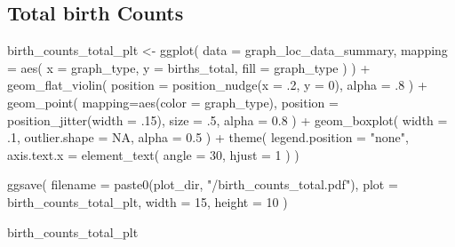 \documentclass[
]{book}
\newenvironment{Shaded}{\begin{snugshade}}{\end{snugshade}}
\newcommand{\AttributeTok}[1]{\textcolor[rgb]{0.77,0.63,0.00}{#1}}
\newcommand{\ConstantTok}[1]{\textcolor[rgb]{0.00,0.00,0.00}{#1}}
\newcommand{\DecValTok}[1]{\textcolor[rgb]{0.00,0.00,0.81}{#1}}
\newcommand{\FloatTok}[1]{\textcolor[rgb]{0.00,0.00,0.81}{#1}}
\newcommand{\FunctionTok}[1]{\textcolor[rgb]{0.00,0.00,0.00}{#1}}
\newcommand{\NormalTok}[1]{#1}
\newcommand{\OtherTok}[1]{\textcolor[rgb]{0.56,0.35,0.01}{#1}}
\newcommand{\SpecialCharTok}[1]{\textcolor[rgb]{0.00,0.00,0.00}{#1}}
\newcommand{\StringTok}[1]{\textcolor[rgb]{0.31,0.60,0.02}{#1}}
\begin{document}
\hypertarget{total-birth-counts}{%
\subsection{Total birth Counts}\label{total-birth-counts}}

\begin{Shaded}
\begin{Highlighting}[]
\NormalTok{birth\_counts\_total\_plt }\OtherTok{\textless{}{-}} \FunctionTok{ggplot}\NormalTok{(}
    \AttributeTok{data =}\NormalTok{ graph\_loc\_data\_summary,}
    \AttributeTok{mapping =} \FunctionTok{aes}\NormalTok{(}
      \AttributeTok{x =}\NormalTok{ graph\_type,}
      \AttributeTok{y =}\NormalTok{ births\_total,}
      \AttributeTok{fill =}\NormalTok{ graph\_type}
\NormalTok{    )}
\NormalTok{  ) }\SpecialCharTok{+}
  \FunctionTok{geom\_flat\_violin}\NormalTok{(}
    \AttributeTok{position =} \FunctionTok{position\_nudge}\NormalTok{(}\AttributeTok{x =}\NormalTok{ .}\DecValTok{2}\NormalTok{, }\AttributeTok{y =} \DecValTok{0}\NormalTok{),}
    \AttributeTok{alpha =}\NormalTok{ .}\DecValTok{8}
\NormalTok{  ) }\SpecialCharTok{+}
  \FunctionTok{geom\_point}\NormalTok{(}
    \AttributeTok{mapping=}\FunctionTok{aes}\NormalTok{(}\AttributeTok{color =}\NormalTok{ graph\_type),}
    \AttributeTok{position =} \FunctionTok{position\_jitter}\NormalTok{(}\AttributeTok{width =}\NormalTok{ .}\DecValTok{15}\NormalTok{),}
    \AttributeTok{size =}\NormalTok{ .}\DecValTok{5}\NormalTok{,}
    \AttributeTok{alpha =} \FloatTok{0.8}
\NormalTok{  ) }\SpecialCharTok{+}
  \FunctionTok{geom\_boxplot}\NormalTok{(}
    \AttributeTok{width =}\NormalTok{ .}\DecValTok{1}\NormalTok{,}
    \AttributeTok{outlier.shape =} \ConstantTok{NA}\NormalTok{,}
    \AttributeTok{alpha =} \FloatTok{0.5}
\NormalTok{  ) }\SpecialCharTok{+}
  \FunctionTok{theme}\NormalTok{(}
    \AttributeTok{legend.position =} \StringTok{"none"}\NormalTok{,}
    \AttributeTok{axis.text.x =} \FunctionTok{element\_text}\NormalTok{(}
      \AttributeTok{angle =} \DecValTok{30}\NormalTok{,}
      \AttributeTok{hjust =} \DecValTok{1}
\NormalTok{    )}
\NormalTok{  )}

\FunctionTok{ggsave}\NormalTok{(}
  \AttributeTok{filename =} \FunctionTok{paste0}\NormalTok{(plot\_dir, }\StringTok{"/birth\_counts\_total.pdf"}\NormalTok{),}
  \AttributeTok{plot =}\NormalTok{ birth\_counts\_total\_plt,}
  \AttributeTok{width =} \DecValTok{15}\NormalTok{,}
  \AttributeTok{height =} \DecValTok{10}
\NormalTok{)}

\NormalTok{birth\_counts\_total\_plt}
\end{Highlighting}
\end{Shaded}
\end{document}
